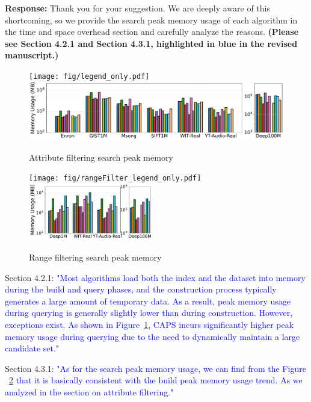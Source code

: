 \documentclass[sigconf, nonacm]{acmart}
\begin{document}
\noindent
\textbf{Response:} 
Thank you for your suggestion. We are deeply aware of this shortcoming, so we provide the search peak memory usage of each algorithm in the time and space overhead section and carefully analyze the reasons. \textbf{(Please see Section 4.2.1 and Section 4.3.1, highlighted in blue in the revised manuscript.)}
\begin{figure}[htbp]
	\centering
	\texttt{[image: fig/legend\_only.pdf]}
	\includegraphics[width=\linewidth]{fig/searchMem/label_memory_comparison.pdf}
	\caption{Attribute filtering search peak memory}
	\label{fig:search_memory_mb_comparison}
\end{figure}

\begin{figure}[htbp]
	\centering
	\texttt{[image: fig/rangeFilter\_legend\_only.pdf]}
	\includegraphics[height=2.5cm]{fig/searchMem/range_memory_comparison.pdf}
	\caption{Range filtering search peak memory}
	\label{fig:rangeFilter_search_memory_mb}
\end{figure}


Section 4.2.1:
\textcolor{blue}{"Most algorithms load both the index and the dataset into memory during the build and query phases, and the construction process typically generates a large amount of temporary data. As a result, peak memory usage during querying is generally slightly lower than during construction. However, exceptions exist. As shown in Figure~\ref{fig:search_memory_mb_comparison}, CAPS incurs significantly higher peak memory usage during querying due to the need to dynamically maintain a large candidate set."}

 Section 4.3.1:
\textcolor{blue}{"As for the search peak memory usage, we can find from the Figure ~\ref{fig:rangeFilter_search_memory_mb} that it is basically consistent with the build peak memory usage trend. As we analyzed in the section on attribute filtering."}
\end{document}
